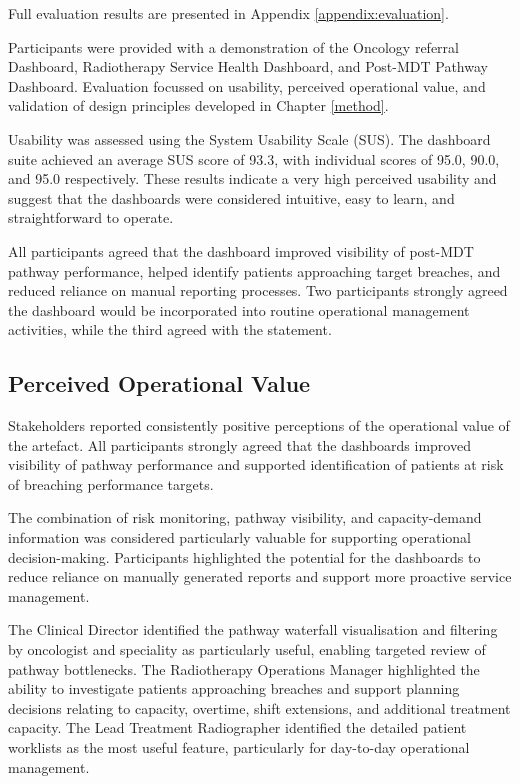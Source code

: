 Full evaluation results are presented in Appendix \ref{appendix:evaluation}.

Participants were provided with a demonstration of the Oncology referral Dashboard, Radiotherapy Service Health Dashboard, and Post-MDT Pathway Dashboard. Evaluation focussed on usability, perceived operational value, and validation of design principles developed in Chapter \ref{method}.

Usability was assessed using the System Usability Scale (SUS). The dashboard suite achieved an average SUS score of 93.3, with individual scores of 95.0, 90.0, and 95.0 respectively. These results indicate a very high perceived usability and suggest that the dashboards were considered intuitive, easy to learn, and straightforward to operate. 

All participants agreed that the dashboard improved visibility of post-MDT pathway performance, helped identify patients approaching target breaches, and reduced reliance on manual reporting processes. Two participants strongly agreed the dashboard would be incorporated into routine operational management activities, while the third agreed with the statement. 

\subsection{Perceived Operational Value}

Stakeholders reported consistently positive perceptions of the operational value of the artefact. All participants strongly agreed that the dashboards improved visibility of pathway performance and supported identification of patients at risk of breaching performance targets. 

The combination of risk monitoring, pathway visibility, and capacity-demand information was considered particularly valuable for supporting operational decision-making. Participants highlighted the potential for the dashboards to reduce reliance on manually generated reports and support more proactive service management. 

The Clinical Director identified the pathway waterfall visualisation and filtering by oncologist and speciality as particularly useful, enabling targeted review of pathway bottlenecks. The Radiotherapy Operations Manager highlighted the ability to investigate patients approaching breaches and support planning decisions relating to capacity, overtime, shift extensions, and additional treatment capacity. The Lead Treatment Radiographer identified the detailed patient worklists as the most useful feature, particularly for day-to-day operational management.

